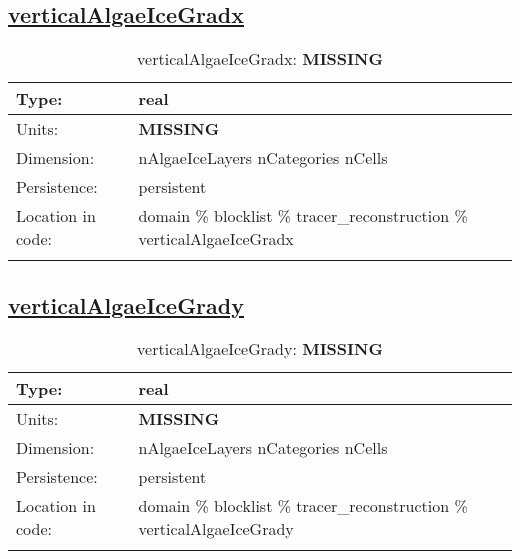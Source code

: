 \subsection[verticalAlgaeIceGradx]{\hyperref[sec:var_tab_tracer_reconstruction]{verticalAlgaeIceGradx}}
\label{subsec:var_sec_tracer_reconstruction_verticalAlgaeIceGradx}
\begin{center}
\begin{longtable}{| p{2.0in} | p{4.0in} |}
        \hline 
        Type: & real \\
        \hline 
        Units: & {\bf \color{red} MISSING} \\
        \hline 
        Dimension: & nAlgaeIceLayers nCategories nCells \\
        \hline 
        Persistence: & persistent \\
        \hline 
         Location in code: & domain \% blocklist \% tracer\_reconstruction \% verticalAlgaeIceGradx \\
         \hline 
    \caption{verticalAlgaeIceGradx: {\bf \color{red} MISSING}}
\end{longtable}
\end{center}
\subsection[verticalAlgaeIceGrady]{\hyperref[sec:var_tab_tracer_reconstruction]{verticalAlgaeIceGrady}}
\label{subsec:var_sec_tracer_reconstruction_verticalAlgaeIceGrady}
\begin{center}
\begin{longtable}{| p{2.0in} | p{4.0in} |}
        \hline 
        Type: & real \\
        \hline 
        Units: & {\bf \color{red} MISSING} \\
        \hline 
        Dimension: & nAlgaeIceLayers nCategories nCells \\
        \hline 
        Persistence: & persistent \\
        \hline 
         Location in code: & domain \% blocklist \% tracer\_reconstruction \% verticalAlgaeIceGrady \\
         \hline 
    \caption{verticalAlgaeIceGrady: {\bf \color{red} MISSING}}
\end{longtable}
\end{center}
